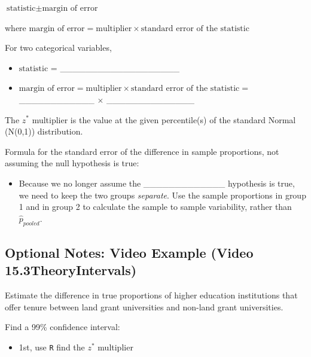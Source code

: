 \documentclass[
]{report}
\providecommand{\tightlist}{%
  \setlength{\itemsep}{0pt}\setlength{\parskip}{0pt}}
\newcommand{\rgi}{\hspace{24pt}}  %
\begin{document}
\rgi \rgi \(\text{statistic} \pm \text{margin of error}\)

\rgi \rgi where \(\text{margin of error} = \text{multiplier} \times \text{standard error of the statistic}\)

For two categorical variables,

\begin{itemize}
\item
  \(\text{statistic}\) = \_\_\_\_\_\_\_\_\_\_\_\_\_\_\_\_\_\_\_
\item
  \(\text{margin of error} = \text{multiplier} \times \text{standard error of the statistic}=\) \_\_\_\_\_\_\_\_\_\_\_\_ \(\times\) \_\_\_\_\_\_\_\_\_\_\_\_\_\_
\end{itemize}

The \(z^*\) multiplier is the value at the given percentile(s) of the standard Normal (N(0,1)) distribution.

Formula for the standard error of the difference in sample proportions, not assuming the null hypothesis is true:

\vspace{0.6in}

\begin{itemize}
\tightlist
\item
  Because we no longer assume the \_\_\_\_\_\_\_\_\_\_\_\_\_ hypothesis is true, we need to keep the two groups \emph{separate}. Use the sample proportions in group 1 and in group 2 to calculate the sample to sample variability, rather than \(\hat{p}_{pooled}\).
\end{itemize}


\subsection*{Optional Notes: Video Example (Video 15.3TheoryIntervals)}\label{optional-notes-video-example-video-15.3theoryintervals}

Estimate the difference in true proportions of higher education institutions that offer tenure between land grant universities and non-land grant universities.

Find a 99\% confidence interval:

\begin{itemize}
\tightlist
\item
  1st, use \texttt{R} find the \(z^*\) multiplier
\end{itemize}
\end{document}
